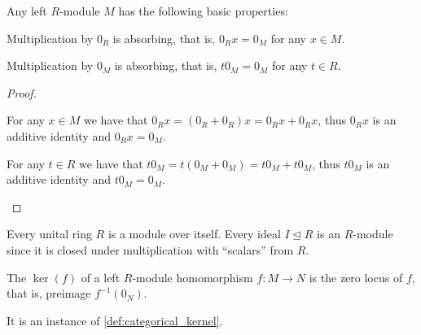 \begin{proposition}\label{def:left_module_properties}
  Any left \( R \)-module \( M \) has the following basic properties:
  \begin{propenum}
     Multiplication by \( 0_R \) is absorbing, that is, \( 0_R x = 0_M \) for any \( x \in M \).

     Multiplication by \( 0_M \) is absorbing, that is, \( t 0_M = 0_M \) for any \( t \in R \).
  \end{propenum}
\end{proposition}
\begin{proof}\mbox{}
  \begin{itemize}
     For any \( x \in M \) we have that \( 0_R x = (0_R + 0_R)x = 0_R x + 0_R x \), thus \( 0_R x \) is an additive identity and \( 0_R x = 0_M \).

     For any \( t \in R \) we have that \( t 0_M = t (0_M + 0_M) = t 0_M + t 0_M \), thus \( t 0_M \) is an additive identity and \( t 0_M = 0_M \).
  \end{itemize}
\end{proof}

\begin{example}\label{ex:module/ideal_of_ring}
  Every unital ring \( R \) is a module over itself. Every ideal \( I \unlhd R \) is an \( R \)-module since it is closed under multiplication with \enquote{scalars} from \( R \).
\end{example}

\begin{definition}\label{def:left_module_kernel}
  The  \( \ker(f) \) of a left \( R \)-module homomorphism \( f: M \to N \) is the zero locus of \( f \), that is, preimage \( f^{-1}(0_N) \).

  It is an instance of \cref{def:categorical_kernel}.
\end{definition}

